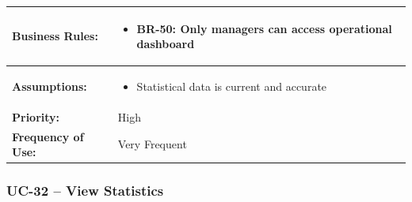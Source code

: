 \documentclass[12pt,a4paper]{article}
\begin{document}
\begin{longtable}{|p{4.5cm}|p{10.5cm}|}
\hline
\textbf{Business Rules:} &
\begin{itemize}
  \item BR-50: Only managers can access operational dashboard
\end{itemize} \\
\hline
\textbf{Assumptions:} &
\begin{itemize}
  \item Statistical data is current and accurate
\end{itemize} \\
\hline
\textbf{Priority:} & High \\
\hline
\textbf{Frequency of Use:} & Very Frequent \\
\hline
\end{longtable}

\subsubsection{UC-32 – View Statistics}
\end{document}
